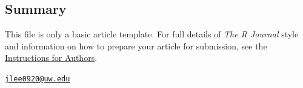 \hypertarget{summary}{%
\subsection{Summary}\label{summary}}

This file is only a basic article template. For full details of
\emph{The R Journal} style and information on how to prepare your
article for submission, see the
\href{https://journal.r-project.org/share/author-guide.pdf}{Instructions
for Authors}.




\address{%
James Lee\\
University of Washington\\
line 1\\ line 2\\
}
\href{mailto:jlee0920@uw.edu}{\nolinkurl{jlee0920@uw.edu}}


